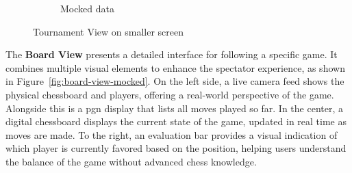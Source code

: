 \begin{figure}[h!]
\begin{subfigure}[h!]{0.4\linewidth}
        \caption{Mocked data}
        \label{fig:small-tournament-view}
    \end{subfigure}
    \caption{Tournament View on smaller screen}
    \label{fig:small-view-tournament-view-group}
\end{figure}

The \textbf{Board View} presents a detailed interface for following a specific game. It combines multiple visual elements to enhance the spectator experience, as shown in Figure~\ref{fig:board-view-mocked}. On the left side, a live camera feed shows the physical chessboard and players, offering a real-world perspective of the game. Alongside this is a \gls{pgn} display that lists all moves played so far. In the center, a digital chessboard displays the current state of the game, updated in real time as moves are made. To the right, an evaluation bar provides a visual indication of which player is currently favored based on the position, helping users understand the balance of the game without advanced chess knowledge. \\

